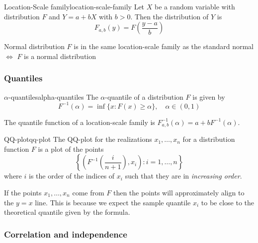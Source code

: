 \documentclass[12pt]{extarticle}
\begin{document}
\begin{definition}{Location-Scale family}{location-scale-family}
    Let $X$ be a random variable with distribution $F$ and $Y = a + bX$ with $b>0$.
    Then the distribution of $Y$ is
    \begin{equation}
        F_{a, b}(y) = F\left( \frac{y-a}{b} \right)
    \end{equation}
\end{definition}

\begin{example}{Normal distribution}{}
    $F$ is in the same location-scale family as the standard normal $\iff$ $F$ is a normal distribution
\end{example}

\subsubsection{Quantiles}

\begin{definition}{$\alpha$-quantiles}{alpha-quantiles}
    The $\alpha$-quantile of a distribution $F$ is given by
    \begin{equation}
        F^{-1}(\alpha) = \inf\{ x: F(x) \geq \alpha \}, \quad \alpha \in (0, 1)
    \end{equation}
\end{definition}

The quantile function of a location-scale family is
$F_{a, b}^{-1}(\alpha) = a + bF^{-1}(\alpha)$.

\begin{definition}{QQ-plot}{qq-plot}
    The QQ-plot for the realizations $x_1, \dots, x_n$ for a distribution function $F$ is a plot of the points
    \begin{equation}
        \left\{ \left( F^{-1}\left( \frac{i}{n+1} \right), x_i \right) : i = 1, \dots, n \right\}
    \end{equation}
    where $i$ is the order of the indices of $x_i$ such that they are in \textit{increasing order}.
\end{definition}

If the points $x_1, \dots, x_n$ come from $F$ then the points will approximately align to the $y = x$ line.
This is because we expect the sample quantile $x_i$ to be close to the theoretical quantile given by the formula.

\subsubsection{Correlation and independence}
\end{document}
